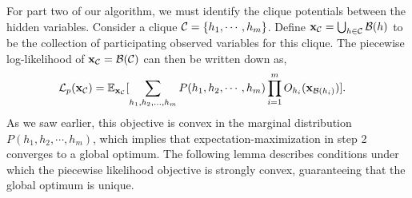 For part two of our algorithm, we must identify the clique potentials between the
  hidden variables. 
Consider a clique $\mathcal{C} = \{h_1, \cdots, h_m\}$. 
Define $\mathbf{x}_{\mathcal{C}} = \bigcup_{h \in \mathcal{C}} \mathcal{B}(h)$ to be the collection of
  participating observed variables for this clique.
The piecewise log-likelihood of $\mathbf{x}_{\mathcal{C}} =\mathcal{B}(\mathcal{C})$ can then be
  written down as,
\begin{align}
  \mathcal{L}_p(\mathbf{x}_{\mathcal{C}}) 
    &= \mathbb{E}_{\mathbf{x}_{\mathcal{C}}}[ \sum_{h_1, h_2, \ldots, h_m} P(h_1, h_2, \cdots, h_m) 
    \prod_{i=1}^{m} O_{h_i}(\mathbf{x}_{\mathcal{B}(h_i)}) ]. \label{eqn:piecewise}
\end{align}
As we saw earlier, this objective is convex in the marginal distribution
  $P(h_1, h_2, \cdots, h_m)$, which implies that
  expectation-maximization in step 2 converges to a global optimum.
The following lemma describes conditions under which the piecewise
  likelihood objective is strongly convex, guaranteeing that the global
  optimum is unique.

